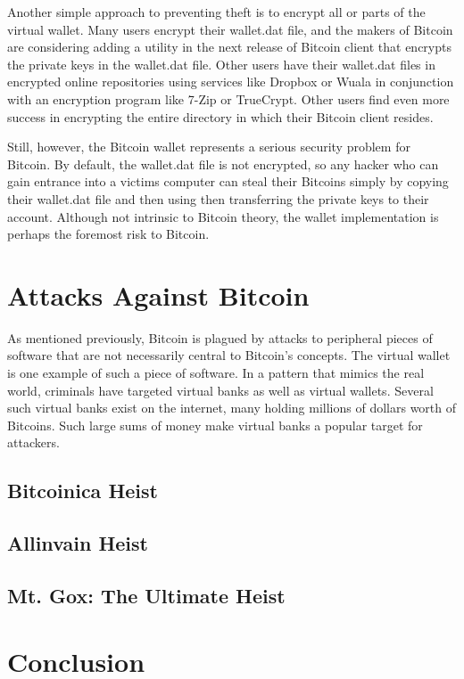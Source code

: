 \documentclass{report}
\begin{document}
Another simple approach to preventing theft is to encrypt all or parts of the virtual 
wallet.  Many users encrypt their wallet.dat file, and the makers of Bitcoin are considering 
adding a utility in the next release of Bitcoin client that encrypts the private keys 
in the wallet.dat file.  Other users have their wallet.dat files in encrypted online 
repositories using services like Dropbox or Wuala in conjunction with an encryption 
program like 7-Zip or TrueCrypt.  Other users find even more success in encrypting the 
entire directory in which their Bitcoin client resides.

Still, however, the Bitcoin wallet represents a serious security problem for Bitcoin.  
By default, the wallet.dat file is not encrypted, so any hacker who can gain entrance 
into a victims computer can steal their Bitcoins simply by copying their wallet.dat file 
and then using then transferring the private keys to their account.  Although not intrinsic 
to Bitcoin theory, the wallet implementation is perhaps the foremost risk to Bitcoin.

\section*{Attacks Against Bitcoin}
As mentioned previously, Bitcoin is plagued by attacks to peripheral pieces of software 
that are not necessarily central to Bitcoin's concepts.  The virtual wallet is one example
of such a piece of software.  In a pattern that mimics the real world, criminals have
targeted virtual banks as well as virtual wallets.  Several such virtual banks exist on
the internet, many holding millions of dollars worth of Bitcoins.  Such large sums of 
money make virtual banks a popular target for attackers.

\subsection*{Bitcoinica Heist}

\subsection*{Allinvain Heist}
\subsection*{Mt. Gox: The Ultimate Heist}

\section*{Conclusion}

{}

\end{document}
